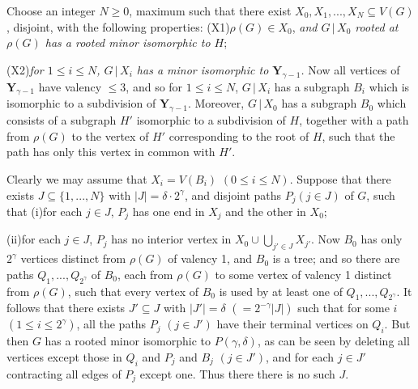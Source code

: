 \noindent Choose an integer $N\ge 0$, maximum such that there exist
$X_0, X_1,..., X_N\subseteq V(G)$, disjoint, with the following properties:
\stmt
\hspace*{12pt}(X1)\quad$\rho(G)\in X_0$, \textit{and $G\,|\,X_0$ rooted at $\rho(G)$ has a rooted minor
isomorphic to $H$};

\hspace*{12pt}(X2)\quad\textit{for $1\le i\le N$, $G\,|\,X_i$ has a minor isomorphic to $\mathbf{Y}_{\gamma-1}$.}
\stmt
Now all vertices of $\mathbf{Y}_{\gamma-1}$ have valency ${\le}3$, and so for $1\le i\le N$, $G\,|\,X_i$ has
a subgraph $B_i$ which is isomorphic to a subdivision of $\mathbf{Y}_{\gamma-1}$. Moreover,
$G\,|\,X_0$ has a subgraph $B_0$ which consists of a subgraph $H'$ isomorphic to a
subdivision of $H$, together with a path from $\rho(G)$ to the vertex of $H'$
corresponding to the root of $H$, such that the path has only this vertex in
common with $H'$.

Clearly we may assume that $X_i=V(B_i)$ $(0\le i\le N)$. Suppose that there
exists $J\subseteq\{1,..., N\}$ with $|J|=\delta\cdot 2^\gamma$, and disjoint paths $P_j(j\in J)$ of $G$, such
that
\stmt
\hspace*{12pt}(i)\enspace for each $j\in J$, $P_j$ has one end in $X_j$ and the other in $X_0$;

\hspace*{12pt}(ii)\enspace for each $j\in J$, $P_j$ has no interior vertex in $X_0\cup\bigcup_{j'\in J}X_{j'}$.
\stmt
\noindent Now $B_0$ has only $2^\gamma$ vertices distinct from $\rho(G)$ of valency 1, and $B_0$ is a tree;
and so there are paths $Q_1,..., Q_{2^\gamma}$ of $B_0$, each from $\rho(G)$ to some vertex of
valency 1 distinct from $\rho(G)$, such that every vertex of $B_0$ is used by at least
one of $Q_1,..., Q_{2^\gamma}$. It follows that there exists $J'\subseteq J$ with $|J'|=\delta$ $(=2^{-\gamma}|J|)$
such that for some $i$ $(1\le i\le 2^\gamma)$, all the paths $P_j$ $(j\in J')$ have their terminal
vertices on $Q_i$. But then $G$ has a rooted minor isomorphic to $P(\gamma, \delta)$, as can
be seen by deleting all vertices except those in $Q_i$ and $P_j$ and $B_j$ $(j\in J')$, and
for each $j\in J'$ contracting all edges of $P_j$ except one. Thus there there is no
such $J$.

